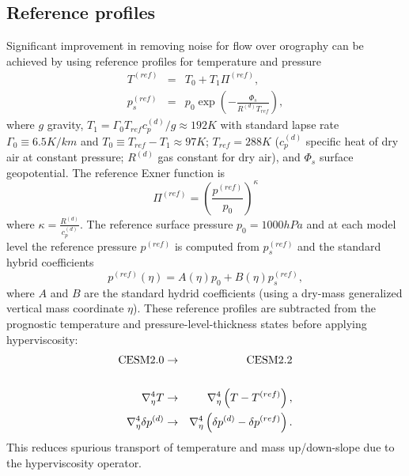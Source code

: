 \documentclass[draft]{agujournal2019}
\begin{document}
\subsection{Reference profiles}
Significant improvement in removing noise for flow over orography can be achieved by using reference profiles for temperature and pressure
\begin{eqnarray}
  T^{(ref)}&=&T_0+T_1 \Pi^{(ref)},\\
  p_s^{(ref)}&=&p_0\exp{\left(-\frac{\Phi_s}{R^{(d)}T_{ref}}\right)},
\end{eqnarray}
 \cite{SJ1991QJRMS} where $g$ gravity, $T_1=\Gamma_0 T_{ref} c_p^{(d)}/g\approx 192K$ with standard lapse rate $\Gamma_0\equiv 6.5K/km$ and $T_0\equiv T_{ref}-T_1\approx 97K$; $T_{ref}=288K$ ($c_p^{(d)}$ specific heat of dry air at constant pressure; $R^{(d)}$ gas constant for dry air), and $\Phi_s$ surface geopotential. The reference Exner function is
\begin{equation}
   \Pi^{(ref)}=\left( \frac{p^{(ref)}}{p_0}\right)^{\kappa}
\end{equation}
where $\kappa=\frac{R^{(d)}}{c_p^{(d)}}$. The reference surface pressure $p_0=1000hPa$ and at each model level the reference pressure $p^{(ref)}$ is computed from $p_s^{(ref)}$ and the standard hybrid coefficients
\begin{equation}
    p^{(ref)}(\eta) = A(\eta)p_0+B(\eta)p_s^{(ref)},
\end{equation}
where $A$ and $B$ are the standard hydrid coefficients (using a dry-mass generalized vertical mass coordinate $\eta$). These reference profiles are subtracted from the prognostic temperature and pressure-level-thickness states before applying hyperviscosity:
\begin{eqnarray}
   \hbox{CESM2.0}&\rightarrow&\hbox{CESM2.2}\nonumber \\
   && \nonumber \\
  \nabla^4_\eta T &\rightarrow& \nabla^4_\eta \left(T-T^{(ref)}\right),\label{eq:hyperT}\\ 
    \nabla^4_\eta \delta p^{(d)} &\rightarrow& \nabla^4_\eta \left(\delta p^{(d)}-\delta p^{(ref)}\right).\label{eq:hyperDP}
\end{eqnarray}
This reduces spurious transport of temperature and mass up/down-slope due to the hyperviscosity operator. 
\end{document}
